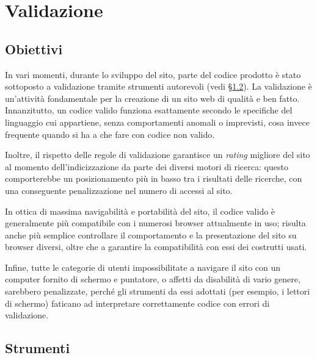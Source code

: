 \section{Validazione}
\label{validazione}

\subsection{Obiettivi}
\label{validazione-obiettivi}

In vari momenti, durante lo sviluppo del sito, parte del codice prodotto è stato sottoposto a validazione tramite strumenti autorevoli (vedi §\ref{validazione-strumenti}). La validazione è un'attività fondamentale per la creazione di un sito web di qualità e ben fatto. Innanzitutto, un codice valido funziona esattamente secondo le specifiche del linguaggio cui appartiene, senza comportamenti anomali o imprevisti, cosa invece frequente quando si ha a che fare con codice non valido. 

Inoltre, il rispetto delle regole di validazione garantisce un \textit{rating} migliore del sito al momento dell'indicizzazione da parte dei diversi motori di ricerca: questo comporterebbe un posizionamento più in basso tra i risultati delle ricerche, con una conseguente penalizzazione nel numero di accessi al sito.

In ottica di massima navigabilità e portabilità del sito, il codice valido è generalmente più compatibile con i numerosi browser attualmente in uso; risulta anche più semplice controllare il comportamento e la presentazione del sito su browser diversi, oltre che a garantire la compatibilità con essi dei costrutti usati.

Infine, tutte le categorie di utenti impossibilitate a navigare il sito con un computer fornito di schermo e puntatore, o affetti da disabilità di vario genere, sarebbero penalizzate, perché gli strumenti da essi adottati (per esempio, i lettori di schermo) faticano ad interpretare correttamente codice con errori di validazione.


\subsection{Strumenti}
\label{validazione-strumenti}

